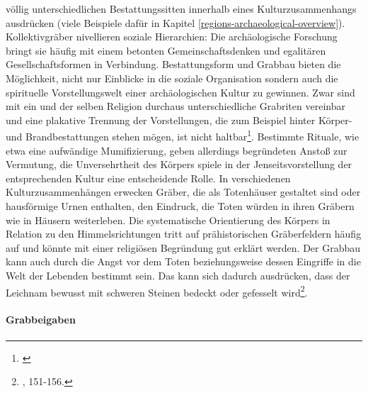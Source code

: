 \documentclass[openany,twoside,twocolumn]{book}
\let\rmarkdownfootnote\footnote%
\def\footnote{\protect\rmarkdownfootnote}
\begin{document}
völlig unterschiedlichen Bestattungssitten innerhalb eines
Kulturzusammenhangs ausdrücken (viele Beispiele dafür in Kapitel
\ref{regions-archaeological-overview}). Kollektivgräber nivellieren
soziale Hierarchien: Die archäologische Forschung bringt sie häufig mit
einem betonten Gemeinschaftsdenken und egalitären Gesellschaftsformen in
Verbindung. Bestattungsform und Grabbau bieten die Möglichkeit, nicht
nur Einblicke in die soziale Organisation sondern auch die spirituelle
Vorstellungswelt einer archäologischen Kultur zu gewinnen. Zwar sind mit
ein und der selben Religion durchaus unterschiedliche Grabriten
vereinbar und eine plakative Trennung der Vorstellungen, die zum
Beispiel hinter Körper- und Brandbestattungen stehen mögen, ist nicht
haltbar\footnote{\textcite{portmann_sterben_1993}}. Bestimmte Rituale,
wie etwa eine aufwändige Mumifizierung, geben allerdings begründeten
Anstoß zur Vermutung, die Unversehrtheit des Körpers spiele in der
Jenseitsvorstellung der entsprechenden Kultur eine entscheidende Rolle.
In verschiedenen Kulturzusammenhängen erwecken Gräber, die als
Totenhäuser gestaltet sind oder hausförmige Urnen enthalten, den
Eindruck, die Toten würden in ihren Gräbern wie in Häusern weiterleben.
Die systematische Orientierung des Körpers in Relation zu den
Himmelsrichtungen tritt auf prähistorischen Gräberfeldern häufig auf und
könnte mit einer religiösen Begründung gut erklärt werden. Der Grabbau
kann auch durch die Angst vor dem Toten beziehungsweise dessen Eingriffe
in die Welt der Lebenden bestimmt sein. Das kann sich dadurch
ausdrücken, dass der Leichnam bewusst mit schweren Steinen bedeckt oder
gefesselt wird\footnote{\textcite{hofmann_rituelle_2008}, 151-156.}.

\hypertarget{grabbeigaben}{%
\paragraph{Grabbeigaben}\label{grabbeigaben}}
\end{document}
